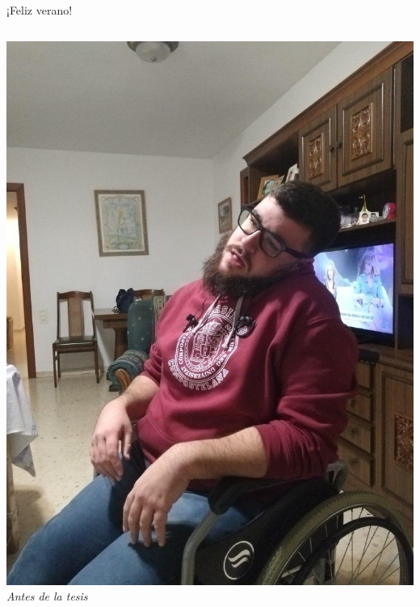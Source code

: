 \documentclass[bigger]{beamer}
\begin{document}
	\begin{frame}{¡Feliz verano!}
		\begin{columns}[T]
				\begin{column}[T]{6cm}
					\centering
					\includegraphics[scale=0.15]{img/yo.jpg}
					\small
					\textit{Antes de la tesis}
				\end{column}
				

\end{columns}
\end{frame}
\end{document}
